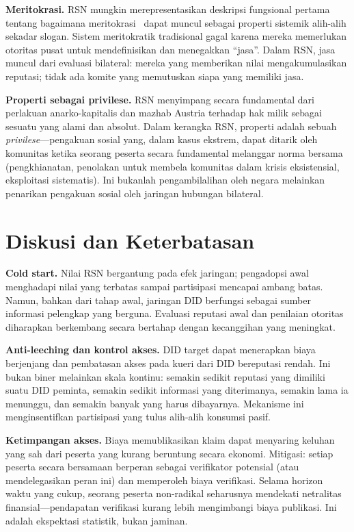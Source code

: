 \documentclass[11pt,a4paper,twocolumn]{article}
\begin{document}
\textbf{Meritokrasi.} RSN mungkin merepresentasikan deskripsi fungsional pertama tentang bagaimana meritokrasi~\cite{young1958} dapat muncul sebagai properti sistemik alih-alih sekadar slogan. Sistem meritokratik tradisional gagal karena mereka memerlukan otoritas pusat untuk mendefinisikan dan menegakkan ``jasa''. Dalam RSN, jasa muncul dari evaluasi bilateral: mereka yang memberikan nilai mengakumulasikan reputasi; tidak ada komite yang memutuskan siapa yang memiliki jasa.

\textbf{Properti sebagai privilese.} RSN menyimpang secara fundamental dari perlakuan anarko-kapitalis dan mazhab Austria terhadap hak milik sebagai sesuatu yang alami dan absolut. Dalam kerangka RSN, properti adalah sebuah \emph{privilese}---pengakuan sosial yang, dalam kasus ekstrem, dapat ditarik oleh komunitas ketika seorang peserta secara fundamental melanggar norma bersama (pengkhianatan, penolakan untuk membela komunitas dalam krisis eksistensial, eksploitasi sistematis). Ini bukanlah pengambilalihan oleh negara melainkan penarikan pengakuan sosial oleh jaringan hubungan bilateral.

\section{Diskusi dan Keterbatasan}

\textbf{Cold start.} Nilai RSN bergantung pada efek jaringan; pengadopsi awal menghadapi nilai yang terbatas sampai partisipasi mencapai ambang batas. Namun, bahkan dari tahap awal, jaringan DID berfungsi sebagai sumber informasi pelengkap yang berguna. Evaluasi reputasi awal dan penilaian otoritas diharapkan berkembang secara bertahap dengan kecanggihan yang meningkat.

\textbf{Anti-leeching dan kontrol akses.} DID target dapat menerapkan biaya berjenjang dan pembatasan akses pada kueri dari DID bereputasi rendah. Ini bukan biner melainkan skala kontinu: semakin sedikit reputasi yang dimiliki suatu DID peminta, semakin sedikit informasi yang diterimanya, semakin lama ia menunggu, dan semakin banyak yang harus dibayarnya. Mekanisme ini menginsentifkan partisipasi yang tulus alih-alih konsumsi pasif.

\textbf{Ketimpangan akses.} Biaya memublikasikan klaim dapat menyaring keluhan yang sah dari peserta yang kurang beruntung secara ekonomi. Mitigasi: setiap peserta secara bersamaan berperan sebagai verifikator potensial (atau mendelegasikan peran ini) dan memperoleh biaya verifikasi. Selama horizon waktu yang cukup, seorang peserta non-radikal seharusnya mendekati netralitas finansial---pendapatan verifikasi kurang lebih mengimbangi biaya publikasi. Ini adalah ekspektasi statistik, bukan jaminan.
\end{document}
